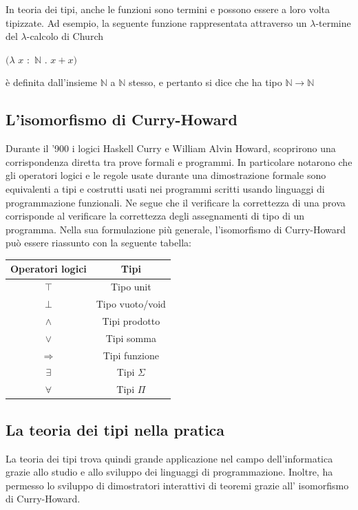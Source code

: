 \documentclass[12pt,a4paper]{mimosis}
\begin{document}
In teoria dei tipi, anche le funzioni sono termini e possono essere
a loro volta tipizzate. Ad esempio, la seguente funzione rappresentata attraverso un $\lambda$-termine
del $\lambda$-calcolo di Church 
\begin{center}
  $(\lambda$ $x$ $:$ $\mathbb{N}$ $.$ $x + x)$
\end{center}

è definita dall'insieme $\mathbb{N}$ a $\mathbb{N}$ stesso, e pertanto si dice che ha tipo $\mathbb{N} \rightarrow \mathbb{N}$

\subsection{L'isomorfismo di Curry-Howard}
Durante il '900 i logici Haskell Curry e William Alvin Howard, scoprirono una
corrispondenza diretta tra prove formali e programmi. In particolare notarono
che gli operatori logici e le regole usate durante una dimostrazione formale
sono equivalenti a tipi e costrutti usati nei programmi scritti usando linguaggi
di programmazione funzionali. Ne segue che il verificare la correttezza di una
prova corrisponde al verificare la correttezza degli assegnamenti di tipo di un
programma. Nella sua formulazione più generale, l'isomorfismo di Curry-Howard
può essere riassunto con la seguente tabella:

\begin{center}
  \begin{tabular}{ | c | c |}
    \hline
    \textbf{Operatori logici} & \textbf{Tipi} \\
    \hline
    $\top$ & Tipo unit \\
    \hline
    $\bot $ & Tipo vuoto/void \\
    \hline
   $\wedge$ & Tipi prodotto \\  
    \hline
   $\vee$ & Tipi somma \\
    \hline
   $\Rightarrow$ & Tipi funzione \\ 
    \hline
   $\exists$ & Tipi $\Sigma$ \\ 
    \hline
    $\forall $ & Tipi $\Pi$ \\ 
    \hline

  \end{tabular}
\end{center}

\subsection{La teoria dei tipi nella pratica}
La teoria dei tipi trova quindi grande applicazione nel campo dell'informatica
grazie allo studio e allo sviluppo dei linguaggi di programmazione. Inoltre,
ha permesso lo sviluppo di dimostratori interattivi di teoremi grazie all'
isomorfismo di Curry-Howard.
\end{document}
